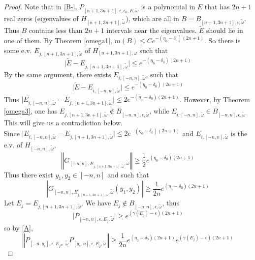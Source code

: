 \begin{proof}
   Note that in \eqref{B-}, $P_{[n+1,3n+1],\epsilon,\epsilon_0,E,\tilde{\omega}}$ is a polynomial in $E$ that has $2n+1$ real zeros (eigenvalues of $H_{[n+1,3n+1],\tilde{\omega}}$), which are all in $B=B_{[n+1,3n+1],\epsilon,\tilde{\omega}}$. Thus $B$ contains less than $2n+1$ intervals near the eigenvalues. $\tilde{E}$ should lie in one of them. By Theorem \ref{omega1}, $m(B)\leq Ce^{-(\eta_0-\delta_0)(2n+1)}$. So there is some e.v. $E_{j,[n+1,3n+1],\tilde{\omega}}$ of $H_{[n+1,3n+1],\omega}$ such that
   \[
   \vert\tilde{E}-E_{j,[n+1,3n+1],\tilde{\omega}}\vert\leq e^{-(\eta_0-\delta_0)(2n+1)}
   \]
  By the same argument, there exists $ E_{i,[-n,n],\tilde{\omega}}$, such that
   \[
   \vert\tilde{E}-E_{i,[-n,n],\tilde{\omega}}\vert\leq e^{-(\eta_0-\delta_0)(2n+1)}
   \]
   Thus $\vert E_{i,[-n,n],\tilde{\omega}}-E_{j,[n+1,3n+1],\tilde{\omega}}\vert\leq 2e^{-(\eta_0-\delta_0)(2n+1)}$. However, by Theorem \ref{omega3}, one has $E_{j,[n+1,3n+1],\tilde{\omega}}\notin B_{[-n,n],\epsilon,\tilde{\omega}}$, while $E_{i,[-n,n],\tilde{\omega}}\in B_{[-n,n],\epsilon,\tilde{\omega}}$
   This will give us a contradiction below.\\
Since $\vert E_{i,[-n,n],\tilde{\omega}}-E_{j,[n+1,3n+1],\tilde{\omega}}\vert\leq 2e^{-(\eta_0-\delta_0)(2n+1)}$ and $E_{i,[-n,n],\tilde{\omega}}$ is the e.v. of $H_{[-n,n],\tilde{\omega}}$,
\[
  \left\Vert G_{[-n,n],E_{j,[n+1,3n+1],\tilde{\omega}},\tilde{\omega}}\right\Vert\geq \frac{1}{2}e^{(\eta_0-\delta_0)(2n+1)}
\]
Thus there exist $ y_{1},y_{2}\in [-n,n]$ and such that
\[
  \left\vert G_{[-n,n],E_{j,[n+1,3n+1],\tilde{\omega}},\tilde{\omega}}(y_{1},y_{2})\right\vert\geq \frac{1}{2n}e^{(\eta_0-\delta_0)(2n+1)}
\]
Let $E_j=E_{j,[n+1,3n+1],\tilde{\omega}}$. We have $E_j\notin B_{[-n,n],\epsilon,\tilde{\omega}}$, thus
\[
\vert P_{[-n,n],\epsilon,E_j,\tilde{\omega}}\vert\geq e^{(\gamma(E_j)-\epsilon)(2n+1)}
\]
so by \eqref{A},
\begin{equation}\label{last}
  \left\Vert P_{[-n,y_{1}],\epsilon,E_j，\tilde{\omega}}P_{[y_{2},n],\epsilon,E_j,\tilde{\omega}}\right\Vert\geq\frac{1}{2n}e^{(\eta_0-\delta_0)(2n+1)}e^{(\gamma(E_j)-\epsilon)(2n+1)}
\end{equation}

\end{proof}
